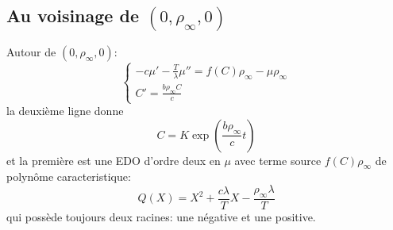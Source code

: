\documentclass[12pt]{extarticle}
\newcommand{\Tl}{\frac{T}{\lambda}}
\begin{document}
\subsection{Au voisinage de $(0,\rho_\infty,0)$} 
Autour de $(0,\rho_\infty,0)$:
\begin{equation} \left\{ \begin{array}{ll} -c \mu'-\Tl\mu''=f(C)\rho_\infty-\mu\rho_\infty\\C'=\frac{b\rho_\infty C}{c} \end{array}\right.
\end{equation}
la deuxième ligne donne \begin{equation}
C = K\exp(\frac{b\rho_\infty}{c}t )
\end{equation}
et la première est une EDO d'ordre deux  en $\mu$ avec terme source $f(C)\rho_\infty$ de polynôme caracteristique: \begin{equation}
	Q(X)=X^2+\frac{c\lambda}{T}X-\frac{\rho_\infty\lambda}{T}
\end{equation} 
qui possède toujours deux racines: une négative et une positive.
\end{document}
